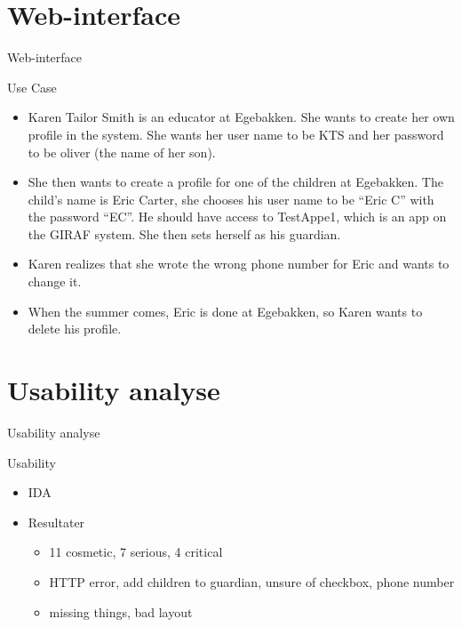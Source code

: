 \section{Web-interface}
\begin{frame}{Web-interface}
\pause
		\begin{block}{Use Case}
				\begin{itemize}
					\item Karen Tailor Smith is an educator at Egebakken. She wants to create her own profile in the system. She wants her user name to be KTS and her password to be oliver (the name of her son).
					\item She then wants to create a profile for one of the children at Egebakken. The child's name is Eric Carter, she chooses his user name to be ``Eric C'' with the password ``EC''. He should have access to TestAppe1, which is an app on the GIRAF system. She then sets herself as his guardian.
					\item Karen realizes that she wrote the wrong phone number for Eric and wants to change it.
					\item When the summer comes, Eric is done at Egebakken, so Karen wants to delete his profile.
				\end{itemize}
		\end{block}
\end{frame}

\section{Usability analyse}
\begin{frame}{Usability analyse}
\pause
		\begin{block}{Usability}
			\begin{itemize}
				\item IDA
				\item Resultater
				\begin{itemize}
					\item 11 cosmetic, 7 serious, 4 critical
					\item HTTP error, add children to guardian, unsure of checkbox, phone number
					\item missing things, bad layout
				\end{itemize}
			\end{itemize}
		\end{block}
\end{frame}